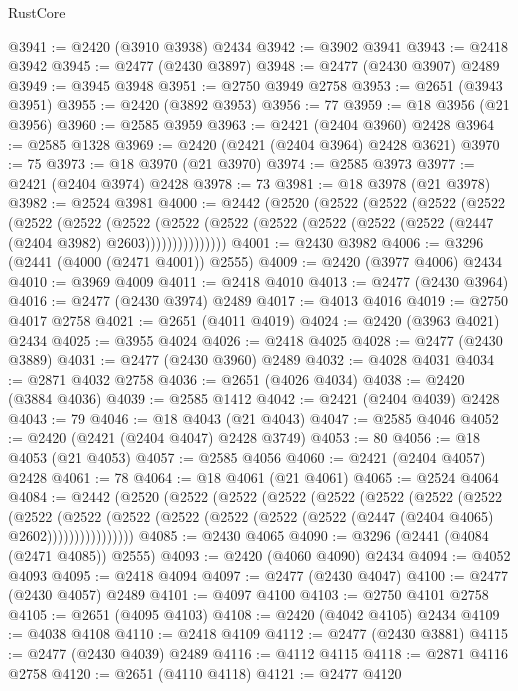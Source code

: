 \begin{lexlean}{RustCore}
\begin{coremodule}
@3941 := @2420 (@3910 @3938) @2434
@3942 := @3902 @3941
@3943 := @2418 @3942
@3945 := @2477 (@2430 @3897)
@3948 := @2477 (@2430 @3907) @2489
@3949 := @3945 @3948
@3951 := @2750 @3949 @2758
@3953 := @2651 (@3943 @3951)
@3955 := @2420 (@3892 @3953)
@3956 := 77
@3959 := @18 @3956 (@21 @3956)
@3960 := @2585 @3959
@3963 := @2421 (@2404 @3960) @2428
@3964 := @2585 @1328
@3969 := @2420 (@2421 (@2404 @3964) @2428 @3621)
@3970 := 75
@3973 := @18 @3970 (@21 @3970)
@3974 := @2585 @3973
@3977 := @2421 (@2404 @3974) @2428
@3978 := 73
@3981 := @18 @3978 (@21 @3978)
@3982 := @2524 @3981
@4000 := @2442
    (@2520
      (@2522
        (@2522
          (@2522
            (@2522
              (@2522
                (@2522
                  (@2522
                    (@2522
                      (@2522 (@2522 (@2522 (@2522 (@2522 (@2447 (@2404 @3982) @2603)))))))))))))))
@4001 := @2430 @3982
@4006 := @3296 (@2441 (@4000 (@2471 @4001)) @2555)
@4009 := @2420 (@3977 @4006) @2434
@4010 := @3969 @4009
@4011 := @2418 @4010
@4013 := @2477 (@2430 @3964)
@4016 := @2477 (@2430 @3974) @2489
@4017 := @4013 @4016
@4019 := @2750 @4017 @2758
@4021 := @2651 (@4011 @4019)
@4024 := @2420 (@3963 @4021) @2434
@4025 := @3955 @4024
@4026 := @2418 @4025
@4028 := @2477 (@2430 @3889)
@4031 := @2477 (@2430 @3960) @2489
@4032 := @4028 @4031
@4034 := @2871 @4032 @2758
@4036 := @2651 (@4026 @4034)
@4038 := @2420 (@3884 @4036)
@4039 := @2585 @1412
@4042 := @2421 (@2404 @4039) @2428
@4043 := 79
@4046 := @18 @4043 (@21 @4043)
@4047 := @2585 @4046
@4052 := @2420 (@2421 (@2404 @4047) @2428 @3749)
@4053 := 80
@4056 := @18 @4053 (@21 @4053)
@4057 := @2585 @4056
@4060 := @2421 (@2404 @4057) @2428
@4061 := 78
@4064 := @18 @4061 (@21 @4061)
@4065 := @2524 @4064
@4084 := @2442
    (@2520
      (@2522
        (@2522
          (@2522
            (@2522
              (@2522
                (@2522
                  (@2522
                    (@2522
                      (@2522
                        (@2522
                          (@2522 (@2522 (@2522 (@2522 (@2447 (@2404 @4065) @2602))))))))))))))))
@4085 := @2430 @4065
@4090 := @3296 (@2441 (@4084 (@2471 @4085)) @2555)
@4093 := @2420 (@4060 @4090) @2434
@4094 := @4052 @4093
@4095 := @2418 @4094
@4097 := @2477 (@2430 @4047)
@4100 := @2477 (@2430 @4057) @2489
@4101 := @4097 @4100
@4103 := @2750 @4101 @2758
@4105 := @2651 (@4095 @4103)
@4108 := @2420 (@4042 @4105) @2434
@4109 := @4038 @4108
@4110 := @2418 @4109
@4112 := @2477 (@2430 @3881)
@4115 := @2477 (@2430 @4039) @2489
@4116 := @4112 @4115
@4118 := @2871 @4116 @2758
@4120 := @2651 (@4110 @4118)
@4121 := @2477 @4120

\end{coremodule}
\end{lexlean}
